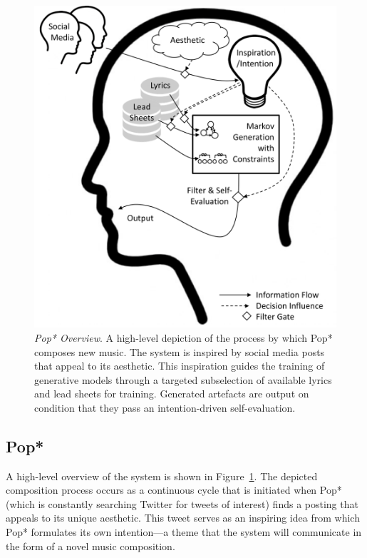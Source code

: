 \documentclass[phd,electronic,oneside,twosidetoc,letterpaper,chaptercenter,parttop,lof,lot]{byumsphd}
\begin{document}
\begin{figure}
    \centering
    \includegraphics[width=\linewidth]{head}
    \caption{\textit{Pop* Overview}. A high-level depiction of the process by which Pop* composes new music. The system is inspired by social media posts that appeal to its aesthetic. This inspiration guides the training of generative models through a targeted subselection of available lyrics and lead sheets for training. Generated artefacts are output on condition that they pass an intention-driven self-evaluation.}
    \label{fig:head}
\end{figure}

\subsection{Pop*}

A high-level overview of the system is shown in Figure~\ref{fig:head}. The depicted composition process occurs as a continuous cycle that is initiated when Pop* (which is constantly searching Twitter for tweets of interest) finds a posting that appeals to its unique aesthetic. This tweet serves as an inspiring idea from which Pop* formulates its own intention---a theme that the system will communicate in the form of a novel music composition. 
\end{document}
